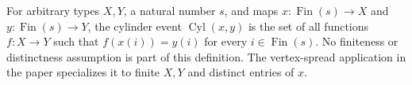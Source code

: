 \begin{definition}
For arbitrary types $X,Y$, a natural number $s$, and maps $x:\operatorname{Fin}(s)\to X$ and $y:\operatorname{Fin}(s)\to Y$, the cylinder event $\operatorname{Cyl}(x,y)$ is the set of all functions $f:X\to Y$ such that $f(x(i))=y(i)$ for every $i\in\operatorname{Fin}(s)$.  No finiteness or distinctness assumption is part of this definition.  The vertex-spread application in the paper specializes it to finite $X,Y$ and distinct entries of $x$.
\end{definition}
